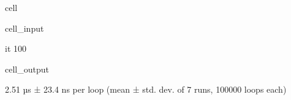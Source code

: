 \documentclass[letterpaper,10pt,english]{jupyterBook}
\begin{document}
\begin{sphinxuseclass}{cell}\begin{sphinxVerbatimInput}

\begin{sphinxuseclass}{cell_input}
\begin{sphinxVerbatim}[commandchars=\\\{\}]
it 100
  \PYG{p}{[}\PYG{p}{]}
   
    \PYG{p}{[}\PYG{p}{]}
\end{sphinxVerbatim}

\end{sphinxuseclass}\end{sphinxVerbatimInput}
\begin{sphinxVerbatimOutput}

\begin{sphinxuseclass}{cell_output}
\begin{sphinxVerbatim}[commandchars=\\\{\}]
2.51 µs ± 23.4 ns per loop (mean ± std. dev. of 7 runs, 100000 loops each)
\end{sphinxVerbatim}

\end{sphinxuseclass}\end{sphinxVerbatimOutput}

\end{sphinxuseclass}
\begin{DUlineblock}{0em}
\item[] 
\end{DUlineblock}
\end{document}
